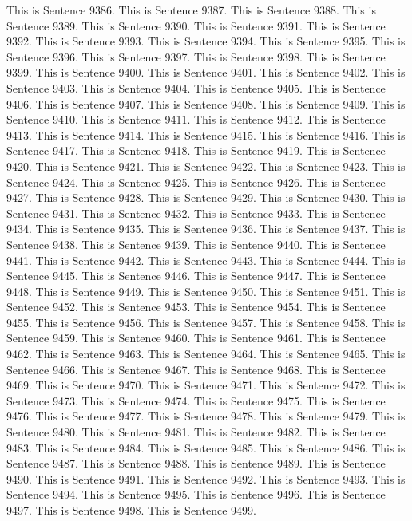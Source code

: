 \documentclass{article}
\begin{document}
This is Sentence 9386.
This is Sentence 9387.
This is Sentence 9388.
This is Sentence 9389.
This is Sentence 9390.
This is Sentence 9391.
This is Sentence 9392.
This is Sentence 9393.
This is Sentence 9394.
This is Sentence 9395.
This is Sentence 9396.
This is Sentence 9397.
This is Sentence 9398.
This is Sentence 9399.
This is Sentence 9400.
This is Sentence 9401.
This is Sentence 9402.
This is Sentence 9403.
This is Sentence 9404.
This is Sentence 9405.
This is Sentence 9406.
This is Sentence 9407.
This is Sentence 9408.
This is Sentence 9409.
This is Sentence 9410.
This is Sentence 9411.
This is Sentence 9412.
This is Sentence 9413.
This is Sentence 9414.
This is Sentence 9415.
This is Sentence 9416.
This is Sentence 9417.
This is Sentence 9418.
This is Sentence 9419.
This is Sentence 9420.
This is Sentence 9421.
This is Sentence 9422.
This is Sentence 9423.
This is Sentence 9424.
This is Sentence 9425.
This is Sentence 9426.
This is Sentence 9427.
This is Sentence 9428.
This is Sentence 9429.
This is Sentence 9430.
This is Sentence 9431.
This is Sentence 9432.
This is Sentence 9433.
This is Sentence 9434.
This is Sentence 9435.
This is Sentence 9436.
This is Sentence 9437.
This is Sentence 9438.
This is Sentence 9439.
This is Sentence 9440.
This is Sentence 9441.
This is Sentence 9442.
This is Sentence 9443.
This is Sentence 9444.
This is Sentence 9445.
This is Sentence 9446.
This is Sentence 9447.
This is Sentence 9448.
This is Sentence 9449.
This is Sentence 9450.
This is Sentence 9451.
This is Sentence 9452.
This is Sentence 9453.
This is Sentence 9454.
This is Sentence 9455.
This is Sentence 9456.
This is Sentence 9457.
This is Sentence 9458.
This is Sentence 9459.
This is Sentence 9460.
This is Sentence 9461.
This is Sentence 9462.
This is Sentence 9463.
This is Sentence 9464.
This is Sentence 9465.
This is Sentence 9466.
This is Sentence 9467.
This is Sentence 9468.
This is Sentence 9469.
This is Sentence 9470.
This is Sentence 9471.
This is Sentence 9472.
This is Sentence 9473.
This is Sentence 9474.
This is Sentence 9475.
This is Sentence 9476.
This is Sentence 9477.
This is Sentence 9478.
This is Sentence 9479.
This is Sentence 9480.
This is Sentence 9481.
This is Sentence 9482.
This is Sentence 9483.
This is Sentence 9484.
This is Sentence 9485.
This is Sentence 9486.
This is Sentence 9487.
This is Sentence 9488.
This is Sentence 9489.
This is Sentence 9490.
This is Sentence 9491.
This is Sentence 9492.
This is Sentence 9493.
This is Sentence 9494.
This is Sentence 9495.
This is Sentence 9496.
This is Sentence 9497.
This is Sentence 9498.
This is Sentence 9499.
\end{document}
